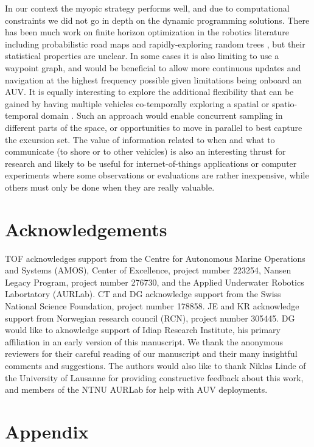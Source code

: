 \documentclass[aoas,preprint]{imsart}
\begin{document}
In our context the myopic strategy performs well, and due to
computational constraints we did not go in depth on the dynamic
programming solutions. There has been much work on finite horizon
optimization in the robotics literature including probabilistic road
maps and rapidly-exploring random trees \citep{karaman2011sampling},
but their statistical properties are unclear.  In some cases it is
also limiting to use a waypoint graph, and would be beneficial to
allow more continuous updates and navigation at the highest frequency
possible given limitations being onboard an AUV.  It is equally
interesting to explore the additional flexibility that can be gained
by having multiple vehicles co-temporally exploring a spatial or
spatio-temporal domain \citep{ferreira2019advancing}. Such an approach
would enable concurrent sampling in different parts of the space, or
opportunities to move in parallel to best capture the excursion set.
The value of information related to when and what to communicate (to
shore or to other vehicles) is also an interesting thrust for research
and likely to be useful for internet-of-things applications or
computer experiments where some observations or evaluations are rather
inexpensive, while others must only be done when they are really
valuable.


\section*{Acknowledgements}

TOF acknowledges support from the Centre for Autonomous Marine
Operations and Systems (AMOS), Center of Excellence, project number
223254, Nansen Legacy Program, project number 276730, and the Applied
Underwater Robotics Labortatory (AURLab). CT and DG acknowledge
support from the Swiss National Science Foundation, project number
178858. JE and KR acknowledge support from Norwegian research council
(RCN), project number 305445. DG would like to aknowledge support of
Idiap Research Institute, his primary affiliation in an early version
of this manuscript. We thank the anonymous reviewers for their careful
reading of our manuscript and their many insightful comments and
suggestions. The authors would also like to thank Niklas Linde of the
University of Lausanne for providing constructive feedback about this
work, and members of the NTNU AURLab for help with AUV deployments.


\footnotesize




\section*{Appendix}

\end{document}

